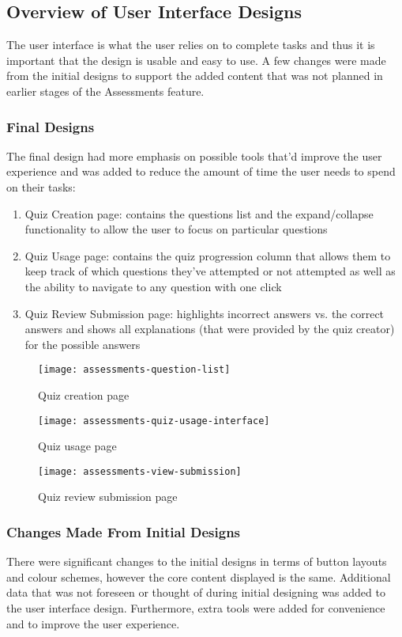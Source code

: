 \subsection{Overview of User Interface Designs}
The user interface is what the user relies on to complete tasks and thus it is important that the design is usable and easy to use. A few changes were made from the initial designs to support the added content that was not planned in earlier stages of the Assessments feature.

\subsubsection{Final Designs}
The final design had more emphasis on possible tools that'd improve the user experience and was added to reduce the amount of time the user needs to spend on their tasks: 

\begin{enumerate}
	\item Quiz Creation page: contains the questions list and the expand/collapse functionality to allow the user to focus on particular questions
	\item Quiz Usage page: contains the quiz progression column that allows them to keep track of which questions they've attempted or not attempted as well as the ability to navigate to any question with one click
	\item Quiz Review Submission page: highlights incorrect answers vs. the correct answers and shows all explanations (that were provided by the quiz creator) for the possible answers
\end{enumerate}

\begin{figure}[h!]
	\centering
	\texttt{[image: assessments-question-list]}
	\caption{Quiz creation page}
\end{figure}

\begin{figure}[h!]
	\centering
	\texttt{[image: assessments-quiz-usage-interface]}
	\caption{Quiz usage page}
\end{figure}

\begin{figure}[h!]
	\centering
	\texttt{[image: assessments-view-submission]}
	\caption{Quiz review submission page}
\end{figure}


\subsubsection{Changes Made From Initial Designs}
There were significant changes to the initial designs in terms of button layouts and colour schemes, however the core content displayed is the same. Additional data that was not foreseen or thought of during initial designing was added to the user interface design. Furthermore, extra tools were added for convenience and to improve the user experience. 

